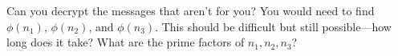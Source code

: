 \documentclass[12pt]{exam}
\begin{document}
\begin{questions}
  \question Can you decrypt the messages that aren't for you? You would need to find $\phi(n_1)$, $\phi(n_2)$, and $\phi(n_3)$. This should be difficult but still possible---how long does it take? What are the prime factors of $n_1,n_2,n_3$?
\end{questions}
\end{document}
